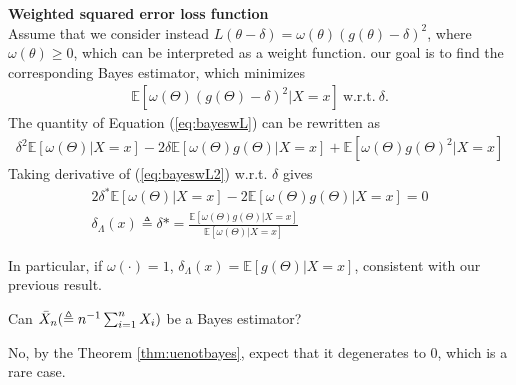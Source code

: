 \begin{example}
    \textbf{Weighted squared error loss function}\\
    Assume that we consider instead  $L(\theta-\delta)=\omega(\theta)(g(\theta)-\delta)^2$,
    where $\omega(\theta)\geq 0$, which can be interpreted as a weight function.
    our goal is to find the corresponding Bayes estimator,
    which minimizes 
    \begin{gather}
        \mathbb{E}[\omega(\Theta)(g(\Theta)-\delta)^2|X=x]~\text{w.r.t.}~\delta.\label{eq:bayeswL}
    \end{gather}
    The quantity of Equation (\ref{eq:bayeswL}) can be rewritten as 
    \begin{gather}
        \delta^2\mathbb{E}[\omega(\Theta)|X=x]
        - 2\delta\mathbb{E}[\omega(\Theta)g(\Theta)|X=x]
        + \mathbb{E}[\omega(\Theta)g(\Theta)^2|X=x]\label{eq:bayeswL2}
    \end{gather}
    Taking derivative of (\ref{eq:bayeswL2}) w.r.t. $\delta$ gives
    \begin{gather}
        2\delta^*\mathbb{E}[\omega(\Theta)|X=x]-2\mathbb{E}[\omega(\Theta)g(\Theta)|X=x]=0\\
        \delta_\Lambda(x)\triangleq\delta*=\frac{\mathbb{E}[\omega(\Theta)g(\Theta)|X=x]}{\mathbb{E}[\omega(\Theta)|X=x]}
    \end{gather}

    In particular, if $\omega(\cdot)=1$, $\delta_\Lambda(x)=\mathbb{E}[g(\Theta)|X=x]$, 
    consistent with our previous result.
\end{example}

\begin{question}
    Can $\Bar{X}_n(\triangleq n^{-1}\sum_{i=1}^n X_i)$ be a Bayes estimator?
\end{question}
\begin{solution}
    No, by the Theorem \ref{thm:uenotbayes}, expect that it degenerates to 0, which is a rare case.
\end{solution}

